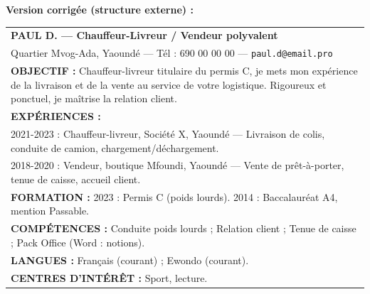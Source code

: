 \documentclass[11pt]{article}
\begin{document}
\begin{corrige}
\textbf{Version corrigée (structure externe) :}
\begin{center}
\begin{tabularx}{\linewidth}{|X|}\hline
\rowcolor{popblueL} \textbf{PAUL D. — Chauffeur-Livreur / Vendeur polyvalent} \\
Quartier Mvog-Ada, Yaoundé — Tél : 690 00 00 00 — \texttt{paul.d@email.pro} \\ \hline
\textbf{OBJECTIF :} Chauffeur-livreur titulaire du permis C, je mets mon expérience de la livraison et de la vente au service de votre logistique. Rigoureux et ponctuel, je maîtrise la relation client. \\ \hline
\textbf{EXPÉRIENCES :} \\
2021-2023 : Chauffeur-livreur, Société X, Yaoundé — Livraison de colis, conduite de camion, chargement/déchargement. \\
2018-2020 : Vendeur, boutique Mfoundi, Yaoundé — Vente de prêt-à-porter, tenue de caisse, accueil client. \\ \hline
\textbf{FORMATION :} 2023 : Permis C (poids lourds). 2014 : Baccalauréat A4, mention Passable. \\ \hline
\textbf{COMPÉTENCES :} Conduite poids lourds ; Relation client ; Tenue de caisse ; Pack Office (Word : notions). \\ \hline
\textbf{LANGUES :} Français (courant) ; Ewondo (courant). \\ \hline
\textbf{CENTRES D'INTÉRÊT :} Sport, lecture. \\ \hline
\end{tabularx}
\end{center}
\end{corrige}
\end{document}
